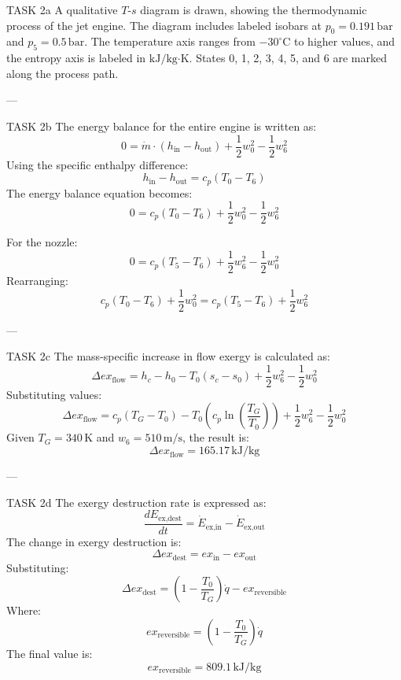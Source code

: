 TASK 2a  
A qualitative \( T \)-\( s \) diagram is drawn, showing the thermodynamic process of the jet engine. The diagram includes labeled isobars at \( p_0 = 0.191 \, \text{bar} \) and \( p_5 = 0.5 \, \text{bar} \). The temperature axis ranges from \( -30^\circ\text{C} \) to higher values, and the entropy axis is labeled in \( \text{kJ/kg·K} \). States 0, 1, 2, 3, 4, 5, and 6 are marked along the process path.

---

TASK 2b  
The energy balance for the entire engine is written as:  
\[
0 = \dot{m} \cdot (h_{\text{in}} - h_{\text{out}}) + \frac{1}{2} w_0^2 - \frac{1}{2} w_6^2
\]  
Using the specific enthalpy difference:  
\[
h_{\text{in}} - h_{\text{out}} = c_p (T_0 - T_6)
\]  
The energy balance equation becomes:  
\[
0 = c_p (T_0 - T_6) + \frac{1}{2} w_0^2 - \frac{1}{2} w_6^2
\]  

For the nozzle:  
\[
0 = c_p (T_5 - T_6) + \frac{1}{2} w_6^2 - \frac{1}{2} w_0^2
\]  
Rearranging:  
\[
c_p (T_0 - T_6) + \frac{1}{2} w_0^2 = c_p (T_5 - T_6) + \frac{1}{2} w_6^2
\]  

---

TASK 2c  
The mass-specific increase in flow exergy is calculated as:  
\[
\Delta ex_{\text{flow}} = h_c - h_0 - T_0 (s_c - s_0) + \frac{1}{2} w_6^2 - \frac{1}{2} w_0^2
\]  
Substituting values:  
\[
\Delta ex_{\text{flow}} = c_p (T_G - T_0) - T_0 \left( c_p \ln \left( \frac{T_G}{T_0} \right) \right) + \frac{1}{2} w_6^2 - \frac{1}{2} w_0^2
\]  
Given \( T_G = 340 \, \text{K} \) and \( w_6 = 510 \, \text{m/s} \), the result is:  
\[
\Delta ex_{\text{flow}} = 165.17 \, \text{kJ/kg}
\]  

---

TASK 2d  
The exergy destruction rate is expressed as:  
\[
\frac{dE_{\text{ex,dest}}}{dt} = \dot{E}_{\text{ex,in}} - \dot{E}_{\text{ex,out}}
\]  
The change in exergy destruction is:  
\[
\Delta ex_{\text{dest}} = ex_{\text{in}} - ex_{\text{out}}
\]  
Substituting:  
\[
\Delta ex_{\text{dest}} = \left( 1 - \frac{T_0}{T_G} \right) \dot{q} - ex_{\text{reversible}}
\]  
Where:  
\[
ex_{\text{reversible}} = \left( 1 - \frac{T_0}{T_G} \right) \dot{q}
\]  
The final value is:  
\[
ex_{\text{reversible}} = 809.1 \, \text{kJ/kg}
\]  